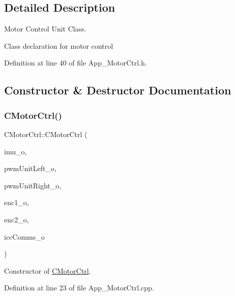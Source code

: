 \subsection{Detailed Description}
Motor Control Unit Class. 

Class declaration for motor control 

Definition at line 40 of file App\+\_\+\+Motor\+Ctrl.\+h.



\subsection{Constructor \& Destructor Documentation}
\mbox{\label{class_c_motor_ctrl_ae51b58d3d46f718599ae4971fad86749}} 
\subsubsection{\texorpdfstring{C\+Motor\+Ctrl()}{CMotorCtrl()}}
{\footnotesize\ttfamily C\+Motor\+Ctrl\+::\+C\+Motor\+Ctrl (\begin{DoxyParamCaption}\item[{\mbox{\hyperlink{class_c_i_m_u_unit}{C\+I\+M\+U\+Unit}} \&}]{imu\+\_\+o,  }\item[{\mbox{\hyperlink{class_c_p_w_m_unit}{C\+P\+W\+M\+Unit}} \&}]{pwm\+Unit\+Left\+\_\+o,  }\item[{\mbox{\hyperlink{class_c_p_w_m_unit}{C\+P\+W\+M\+Unit}} \&}]{pwm\+Unit\+Right\+\_\+o,  }\item[{\mbox{\hyperlink{class_c_encoder}{C\+Encoder}} \&}]{enc1\+\_\+o,  }\item[{\mbox{\hyperlink{class_c_encoder}{C\+Encoder}} \&}]{enc2\+\_\+o,  }\item[{\mbox{\hyperlink{class_c_i_c_c_comms}{C\+I\+C\+C\+Comms}} \&}]{icc\+Comms\+\_\+o }\end{DoxyParamCaption})}



Constructor of \mbox{\hyperlink{class_c_motor_ctrl}{C\+Motor\+Ctrl}}. 



Definition at line 23 of file App\+\_\+\+Motor\+Ctrl.\+cpp.

\mbox{\label{class_c_motor_ctrl_a97e5fbdf11c6562a7895cf4079003132}} 
